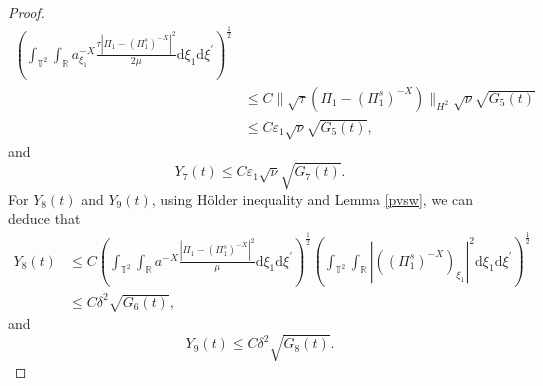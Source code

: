 \documentclass[10pt,reqno]{amsart}
\numberwithin{equation}{section}
\newcommand{\dif}{\mathrm{d}}
\begin{document}
\begin{proof}
\begin{align*}
\left(\int_{\mathbb{T}^2}\int_{\mathbb{R}}a^{-X}_{\xi_1}
\frac{\tau|\Pi_1-(\Pi_1^s)^{-X}|^2}{2\mu}\dif \xi_1\dif\xi^{\prime}\right)^{\frac{1}{2}}\\
&\le C\|\sqrt{\tau}(\Pi_1-(\Pi_1^s)^{-X})\|_{H^2}\sqrt{\nu}\sqrt{G_5(t)}\\
&\le C\varepsilon_1\sqrt{\nu}\sqrt{G_5(t)},
\end{align*}
and
\[
Y_7(t)\le C\varepsilon_1\sqrt{\nu}\sqrt{G_7(t)}.
\]
For $Y_8(t)$ and $Y_9(t)$, using H\"older inequality and Lemma \ref{pvsw}, we can deduce that
\begin{align*}
Y_8(t)&\le C\left(\int_{\mathbb{T}^2}\int_{\mathbb{R}}a^{-X} \frac{|\Pi_1-(\Pi_1^s)^{-X}|^2}{\mu}\dif \xi_1\dif \xi^{\prime}\right)^{\frac{1}{2}}
\left(\int_{\mathbb{T}^2}\int_{\mathbb{R}}|\left((\Pi_1^s)^{-X}\right)_{\xi_1}|^2\dif \xi_1\dif \xi^{\prime}\right)^{\frac{1}{2}}\\
&\le C\delta^2\sqrt{G_6(t)},
\end{align*}
and
\[
Y_9(t)\le C\delta^2\sqrt{G_8(t)}.
\]


\end{proof}
\end{document}
